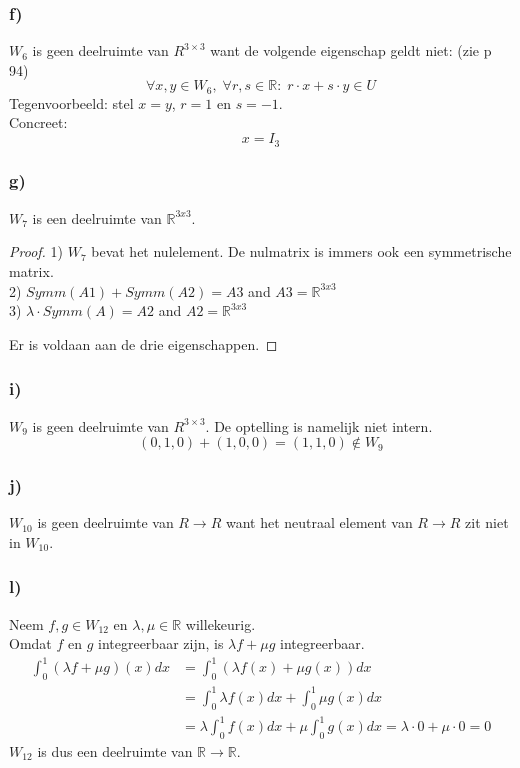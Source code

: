 \documentclass[lineaire_algebra_oplossingen.tex]{subfiles}
\begin{document}
\subsubsection*{f)}
$W_6$ is geen deelruimte van $R^{3\times 3}$ want de volgende eigenschap geldt niet: (zie p 94)
\[
\forall x,y\in W_6,\;\forall r,s\in\mathbb{R}:\; r\cdot x+s\cdot y\in U
\]
Tegenvoorbeeld:
stel $x=y$, $r=1$ en $s=-1$.\\
Concreet:
\[
x = I_3
\]

\subsubsection*{g)}
$W_7$ is een deelruimte van $\mathbb{R}^{3x3}$.\\
\begin{proof} 

1) $W_7$ bevat het nulelement. De nulmatrix is immers ook een symmetrische matrix. \\
2) $ Symm(A1) + Symm(A2) = A3 $
	and $A3 = \mathbb{R}^{3x3}$ \\
3) $ \lambda \cdot Symm(A) = A2 $
	and $ A2 = \mathbb{R}^{3x3}$

Er is voldaan aan de drie eigenschappen.

\end{proof}


\subsubsection*{i)}
$W_9$ is geen deelruimte van $R^{3\times 3}$. De optelling is namelijk niet intern.
\[
(0,1,0) + (1,0,0) = (1,1,0) \not \in W_9
\]

\subsubsection*{j)}
$W_{10}$ is geen deelruimte van $R\rightarrow R$ want het neutraal element van $R\rightarrow R$  zit niet in $W_{10}$.
\subsubsection*{l)}
Neem $f, g \in W_{12}$ en $\lambda, \mu \in \mathbb{R}$ willekeurig.\\
Omdat $f$ en $g$ integreerbaar zijn, is $\lambda f + \mu g$ integreerbaar.
\begin{align*}
  \int^1_0 (\lambda f + \mu g)(x)dx &= \int^1_0(\lambda f(x) + \mu g(x))dx\\
  &= \int^1_0 \lambda f(x)dx + \int^1_0 \mu g(x)dx\\
  &= \lambda \int^1_0 f(x)dx + \mu \int^1_0 g(x)dx = \lambda \cdot 0 + \mu \cdot 0 = 0
\end{align*}
$W_{12}$ is dus een deelruimte van $\mathbb{R} \rightarrow \mathbb{R}$.
\end{document}
